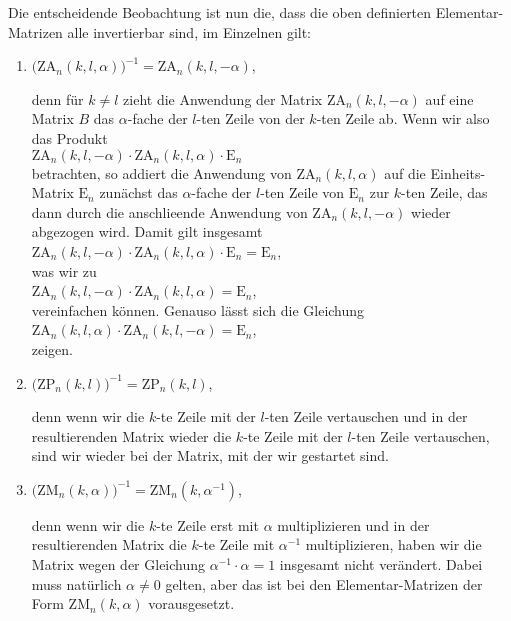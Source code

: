 Die entscheidende Beobachtung ist nun die, dass die oben definierten Elementar-Matrizen alle  invertierbar sind, im Einzelnen gilt:
\begin{enumerate}
\item $\bigl(\mathrm{ZA}_n(k,l,\alpha)\bigr)^{-1} =  \mathrm{ZA}_n(k,l,-\alpha)$,

      denn f\"{u}r $k \not= l$ zieht die Anwendung der Matrix $\mathrm{ZA}_n(k,l,-\alpha)$ auf eine
      Matrix $B$ das $\alpha$-fache der $l$-ten Zeile von der $k$-ten Zeile ab.  Wenn wir also das Produkt
      \\[0.2cm]
      \hspace*{1.3cm}
      $\mathrm{ZA}_n(k,l,-\alpha) \cdot \mathrm{ZA}_n(k,l,\alpha) \cdot \mathrm{E}_n$
      \\[0.2cm]
      betrachten, so addiert die Anwendung von $\mathrm{ZA}_n(k ,l,\alpha)$ auf die
      Einheits-Matrix $\mathrm{E}_n$ zun\"{a}chst das $\alpha$-fache der $l$-ten Zeile von 
      $\mathrm{E}_n$ zur $k$-ten Zeile, das dann durch die anschlie\3ende Anwendung von 
      $\mathrm{ZA}_n(k,l,-\alpha)$ wieder abgezogen wird.  Damit gilt insgesamt
      \\[0.2cm]
      \hspace*{1.3cm}
      $\mathrm{ZA}_n(k,l,-\alpha) \cdot \mathrm{ZA}_n(k,l,\alpha) \cdot \mathrm{E}_n = \mathrm{E}_n$,
      \\[0.2cm]
      was wir zu
      \\[0.2cm]
      \hspace*{1.3cm}
      $\mathrm{ZA}_n(k,l,-\alpha) \cdot \mathrm{ZA}_n(k,l,\alpha) = \mathrm{E}_n$,
      \\[0.2cm]
      vereinfachen k\"{o}nnen.  Genauso l\"{a}sst sich die Gleichung
      \\[0.2cm]
      \hspace*{1.3cm}
      $\mathrm{ZA}_n(k,l,\alpha) \cdot \mathrm{ZA}_n(k,l,-\alpha) = \mathrm{E}_n$,
      \\[0.2cm]
      zeigen.
\item $\bigl(\mathrm{ZP}_n(k,l)\bigr)^{-1} = \mathrm{ZP}_n(k,l)$,

      denn wenn wir die $k$-te Zeile mit der $l$-ten Zeile vertauschen und in der resultierenden
      Matrix wieder die $k$-te Zeile mit der $l$-ten Zeile vertauschen, sind wir wieder bei der
      Matrix, mit der wir gestartet sind.
\item $\bigl(\mathrm{ZM}_n(k,\alpha)\bigr)^{-1} = \mathrm{ZM}_n(k,\alpha^{-1})$,

      denn wenn wir die $k$-te Zeile erst mit $\alpha$ multiplizieren und in der resultierenden
      Matrix  die $k$-te Zeile mit $\alpha^{-1}$ multiplizieren, haben wir die Matrix wegen der
      Gleichung  $\alpha^{-1} \cdot \alpha = 1$ insgesamt nicht ver\"{a}ndert.  Dabei muss nat\"{u}rlich
      $\alpha \not= 0$ gelten, aber das ist bei den Elementar-Matrizen der Form 
      $\mathrm{ZM}_n(k,\alpha)$ vorausgesetzt.
\end{enumerate}

